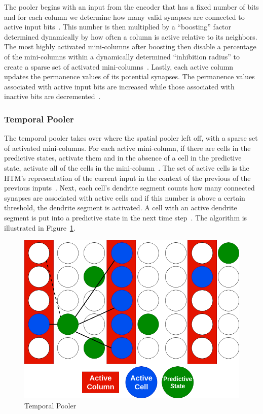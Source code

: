 \documentclass[oneside,12pt,openany]{book}
\begin{document}
	
	The pooler begins with an input from the encoder that has a fixed number of bits and for each column we determine how many valid synapses are connected to active input bits~\cite{Whitepaper}. This number is then multiplied by a ``boosting'' factor determined dynamically by how often a column is active relative to its neighbors. The most highly activated mini-columns after boosting then disable a percentage of the mini-columns within a dynamically determined ``inhibition radius'' to create a sparse set of activated mini-columns~\cite{Whitepaper}. Lastly, each active column updates the permanence values of its potential synapses. The permanence values associated with active input bits are increased while those associated with inactive bits are decremented~\cite{Whitepaper}.

	
	\subsubsection{Temporal Pooler}

	The temporal pooler takes over where the spatial pooler left off, with a sparse set of activated mini-columns. For each active mini-column, if there are cells in the predictive states, activate them and in the absence of a cell in the predictive state, activate all of the cells in the mini-column~\cite{Whitepaper}. The set of active cells is the HTM's representation of the current input in the context of the previous of the previous inputs~\cite{BAMI}. Next, each cell's dendrite segment counts how many connected synapses are associated with active cells and if this number is above a certain threshold, the dendrite segment is activated. A cell with an active dendrite segment is put into a predictive state in the next time step~\cite{BAMI}. The algorithm is illustrated in Figure~\ref{fig:TemporalPooler}.
	
	

	\begin{figure}[hbt!]
		\centering
		\includegraphics[width=.8\linewidth]{images/TemporalPooler.png}
		\caption{Temporal Pooler}
		\label{fig:TemporalPooler}
	\end{figure}
\end{document}
